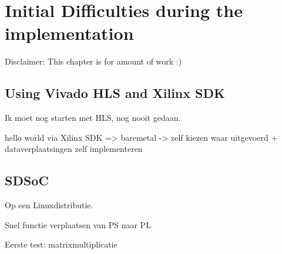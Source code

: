 
\chapter{Initial Difficulties during the implementation}

Disclaimer: This chapter is for amount of work :)

\section{Using Vivado HLS and Xilinx SDK}

Ik moet nog starten met HLS, nog nooit gedaan.

hello world via Xilinx SDK => baremetal 
-> zelf kiezen waar uitgevoerd + dataverplaatsingen zelf implementeren

\section{SDSoC}

Op een Linuxdistributie.

Snel functie verplaatsen van PS naar PL

Eerste test: matrixmultiplicatie
